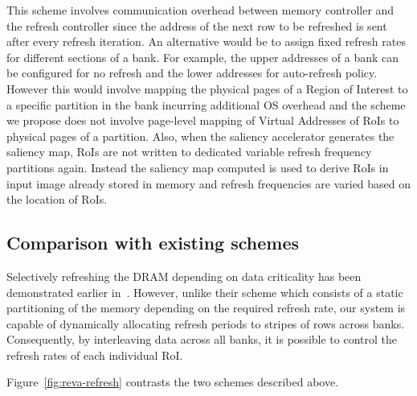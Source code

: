 This scheme involves communication overhead between memory controller and the refresh controller since the address of the next row to be refreshed is sent after every refresh iteration. An alternative would be to assign fixed refresh rates for different sections of a bank. For example, the upper addresses of a bank can be configured for no refresh and the lower addresses for auto-refresh policy. However this would involve mapping the physical pages of a Region of Interest to a specific partition in the bank incurring additional OS overhead and the scheme we propose does not involve page-level mapping of Virtual Addresses of RoIs to physical pages of a partition. Also, when the saliency accelerator generates the saliency map, RoIs are not written to dedicated variable refresh frequency partitions again. Instead the saliency map computed is used to derive RoIs in input image already stored in memory and refresh frequencies are varied based on the location of RoIs. 

\subsection{Comparison with existing schemes}
Selectively refreshing the DRAM depending on data criticality has been demonstrated earlier in~\cite{Liu2011}. However, unlike their scheme which consists of a static partitioning of the memory depending on the required refresh rate, our system is capable of dynamically allocating refresh periods to stripes of rows across banks. Consequently, by interleaving data across all banks, it is possible to control the refresh rates of each individual RoI. 

Figure~\ref{fig:reva-refresh} contrasts the two schemes described above.

